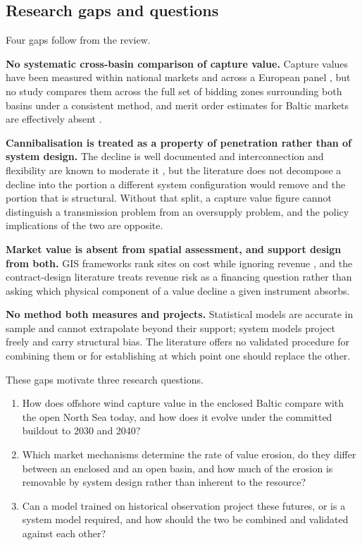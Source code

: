 \subsection{Research gaps and questions}\label{sec:research_gap}

Four gaps follow from the review.

\textbf{No systematic cross-basin comparison of capture value.} Capture values
have been measured within national markets and across a European panel
\cite{Stiewe2025}, but no study compares them across the full set of bidding
zones surrounding both basins under a consistent method, and merit order
estimates for Baltic markets are effectively absent \cite{Cevik2022}.

\textbf{Cannibalisation is treated as a property of penetration rather than of
system design.} The decline is well documented and interconnection and
flexibility are known to moderate it
\cite{Stiewe2025, Schlachtberger2017, OffshoreHybrids2024}, but the literature
does not decompose a decline into the portion a different system configuration
would remove and the portion that is structural. Without that split, a capture
value figure cannot distinguish a transmission problem from an oversupply
problem, and the policy implications of the two are opposite.

\textbf{Market value is absent from spatial assessment, and support design from
both.} GIS frameworks rank sites on cost while ignoring revenue
\cite{Bosch2017, Bosch2018, Bosch2019}, and the contract-design literature
\cite{Beiter2024, Kitzing2024, Dukan2025, Anatolitis2025} treats revenue risk as
a financing question rather than asking which physical component of a value
decline a given instrument absorbs.

\textbf{No method both measures and projects.} Statistical models are accurate
in sample and cannot extrapolate beyond their support; system models project
freely and carry structural bias. The literature offers no validated procedure
for combining them or for establishing at which point one should replace the other.

These gaps motivate three research questions.

\begin{enumerate}
    \item How does offshore wind capture value in the enclosed Baltic compare
    with the open North Sea today, and how does it evolve under the committed
    buildout to 2030 and 2040?
    \item Which market mechanisms determine the rate of value erosion, do they
    differ between an enclosed and an open basin, and how much of the erosion is
    removable by system design rather than inherent to the resource?
    \item Can a model trained on historical observation project these futures, or
    is a system model required, and how should the two be combined and validated
    against each other?
\end{enumerate}

